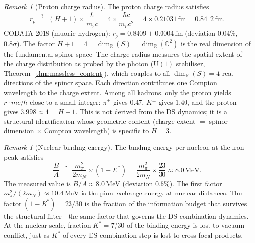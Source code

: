 \documentclass[11pt,a4paper]{article}
\theoremstyle{definition}
\theoremstyle{remark}
\newtheorem{remark}[theorem]{Remark}
\newcommand{\C}{\mathbb{C}}
\newcommand{\R}{\mathbb{R}}
\begin{document}
\begin{remark}[Proton charge radius]\label{rem:proton_radius}
The proton charge radius satisfies
\begin{equation}\label{eq:proton_radius}
r_p \;\stackrel{?}{=}\; (H+1)\times\frac{\hbar}{m_p c} = 4\times\frac{\hbar c}{m_p c^2} = 4\times 0.21031\,\mathrm{fm} = 0.8412\,\mathrm{fm}.
\end{equation}
CODATA 2018 (muonic hydrogen): $r_p=0.8409\pm 0.0004\,\mathrm{fm}$ (deviation $0.04\%$, $0.8\sigma$). The factor $H+1=4=\dim_\R(S)=\dim_\R(\C^2)$ is the real dimension of the fundamental spinor space. The charge radius measures the spatial extent of the charge distribution as probed by the photon ($\mathrm{U}(1)$ stabiliser, Theorem~\ref{thm:massless_content}), which couples to all $\dim_\R(S)=4$ real directions of the spinor space. Each direction contributes one Compton wavelength to the charge extent. Among all hadrons, only the proton yields $r\cdot mc/\hbar$ close to a small integer: $\pi^\pm$ gives $0.47$, $K^\pm$ gives $1.40$, and the proton gives $3.998\approx 4=H+1$. This is not derived from the DS dynamics; it is a structural identification whose geometric content (charge extent $=$ spinor dimension $\times$ Compton wavelength) is specific to $H=3$.
\end{remark}

\begin{remark}[Nuclear binding energy]\label{rem:nuclear_binding}
The binding energy per nucleon at the iron peak satisfies
\begin{equation}\label{eq:nuclear_binding}
\frac{B}{A}\;\stackrel{?}{=}\;\frac{m_\pi^2}{2m_N}\times(1-K^*) = \frac{m_\pi^2}{2m_N}\times\frac{23}{30}\approx 8.0\,\mathrm{MeV}.
\end{equation}
The measured value is $B/A\approx 8.0\,\mathrm{MeV}$ (deviation $0.5\%$). The first factor $m_\pi^2/(2m_N)\approx 10.4\,\mathrm{MeV}$ is the pion-exchange energy at nuclear distances. The factor $(1-K^*)=23/30$ is the fraction of the information budget that survives the structural filter---the same factor that governs the DS combination dynamics. At the nuclear scale, fraction $K^*=7/30$ of the binding energy is lost to vacuum conflict, just as $K^*$ of every DS combination step is lost to cross-focal products.
\end{remark}
\end{document}
